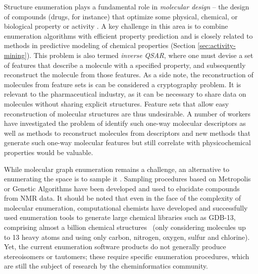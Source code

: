 \documentclass{sig-alternate}
\begin{document}
Structure enumeration plays a fundamental role in \emph{molecular
  design} -- the design of compounds (drugs, for instance) that
optimize some physical, chemical, or biological property or activity
\cite{Schneider:2005uq}. A key challenge in this area is to combine
enumeration algorithms with efficient property prediction and is
closely related to methods in predictive modeling of chemical
properties (Section \ref{sec:activity-mining}). This problem is also
termed \emph{inverse QSAR}, where one must devise a set of features
that describe a molecule with a specified property, and subsequently
reconstruct the molecule from those features. As a side note, the
reconstruction of molecules from feature sets is can be considered a
cryptography problem. It is relevant to the pharmaceutical industry,
as it can be necessary to share data on molecules without sharing
explicit structures. Feature sets that allow easy reconstruction of
molecular structures are thus undesirable. A number of workers have
investigated the problem of identify such one-way molecular
descriptors as well as methods to reconstruct molecules from
descriptors \cite{Masek:2008kx} and new methods that generate such
one-way molecular features but still correlate with physicochemical
properties would be valuable.

While molecular graph enumeration remains a challenge, 
an alternative to enumerating the space is to sample it
\cite{goldberg1999}. Sampling procedures based on Metropolis or
Genetic Algorithms have been developed and used to elucidate
compounds from NMR data. It should be noted that even in the
face of the complexity of molecular enumeration,
computational chemists have developed and successfully used
enumeration tools to generate large chemical libraries such as GDB-13,
comprising almost a billion chemical structures~\cite{GDB} (only
considering molecules up to 13 heavy atoms and using only carbon,
nitrogen, oxygen, sulfur and chlorine). Yet, the current enumeration
software products do not generally produce stereoisomers or tautomers;
these require specific enumeration procedures, which are still the
subject of research by the cheminformatics community.
\end{document}
